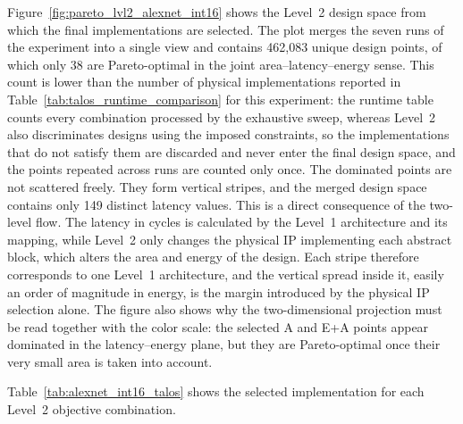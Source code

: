 Figure~\ref{fig:pareto_lvl2_alexnet_int16} shows the Level~2 design
space from which the final implementations are selected. The plot
merges the seven runs of the experiment into a single view and
contains 462,083 unique design points, of which only 38 are
Pareto-optimal in the joint area--latency--energy sense. This count is
lower than the number of physical implementations reported in
Table~\ref{tab:talos_runtime_comparison} for this experiment: the
runtime table counts every combination processed by the exhaustive
sweep, whereas Level~2 also discriminates designs using the imposed
constraints, so the implementations that do not satisfy them are
discarded and never enter the final design space, and the points
repeated across runs are counted only once. The dominated points are
not scattered freely. They form vertical stripes, and the merged
design space contains only 149 distinct latency values. This is a
direct consequence of the two-level flow. The latency in cycles is
calculated by the Level~1 architecture and its mapping, while Level~2 only
changes the physical IP implementing each abstract block, which
alters the area and energy of the design.
Each stripe therefore corresponds to one Level~1 architecture, and the
vertical spread inside it, easily an order of magnitude in energy,
is the margin introduced by the physical IP selection alone. The
figure also shows why
the two-dimensional projection must be read together with the color
scale: the selected A and E+A points appear dominated in the
latency--energy plane, but they are Pareto-optimal once their very
small area is taken into account.

Table~\ref{tab:alexnet_int16_talos} shows the selected implementation
for each Level~2 objective combination.

